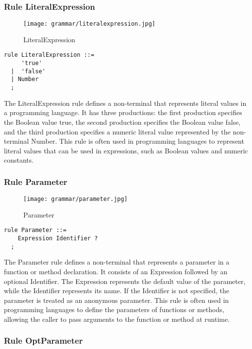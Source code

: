 \subsubsection*{Rule LiteralExpression}

\begin{figure}[!ht]
\centering
\texttt{[image: grammar/literalexpression.jpg]}
\caption{LiteralExpression}
\end{figure}

\begin{lstlisting}
rule LiteralExpression ::=
     'true' 
  |  'false' 
  | Number 
  ;
\end{lstlisting}

The LiteralExpression rule defines a non-terminal that represents literal values in a programming language. It has three productions: the first production specifies the Boolean value true, the second production specifies the Boolean value false, and the third production specifies a numeric literal value represented by the non-terminal Number. This rule is often used in programming languages to represent literal values that can be used in expressions, such as Boolean values and numeric constants.

\subsubsection*{Rule Parameter}

\begin{figure}[!ht]
\centering
\texttt{[image: grammar/parameter.jpg]}
\caption{Parameter}
\end{figure}

\begin{lstlisting}
rule Parameter ::=
    Expression Identifier ?  
  ;
\end{lstlisting}

The Parameter rule defines a non-terminal that represents a parameter in a function or method declaration. It consists of an Expression followed by an optional Identifier. The Expression represents the default value of the parameter, while the Identifier represents its name. If the Identifier is not specified, the parameter is treated as an anonymous parameter. This rule is often used in programming languages to define the parameters of functions or methods, allowing the caller to pass arguments to the function or method at runtime.

\subsubsection*{Rule OptParameter}

